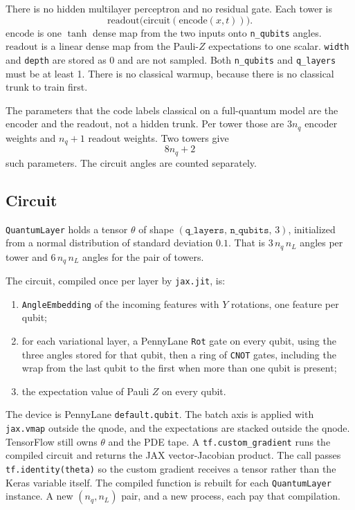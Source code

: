 \documentclass[11pt]{article}
\begin{document}
There is no hidden multilayer perceptron and no residual gate.
Each tower is
\begin{equation}
\mathrm{readout}\big(\mathrm{circuit}(\mathrm{encode}(x,t))\big).
\end{equation}
\(\mathrm{encode}\) is one \(\tanh\) dense map from the two inputs onto \texttt{n\_qubits} angles.
\(\mathrm{readout}\) is a linear dense map from the Pauli-\(Z\) expectations to one scalar.
\texttt{width} and \texttt{depth} are stored as 0 and are not sampled.
Both \texttt{n\_qubits} and \texttt{q\_layers} must be at least 1.
There is no classical warmup, because there is no classical trunk to train first.

The parameters that the code labels classical on a full-quantum model are the encoder and the readout, not a hidden trunk.
Per tower those are \(3n_{q}\) encoder weights and \(n_{q}+1\) readout weights.
Two towers give
\begin{equation}
8n_{q}+2
\end{equation}
such parameters.
The circuit angles are counted separately.

\subsection{Circuit}

\texttt{QuantumLayer} holds a tensor \(\theta\) of shape \((\texttt{q\_layers},\,\texttt{n\_qubits},\,3)\), initialized from a normal distribution of standard deviation \(0.1\).
That is \(3\,n_{q}\,n_{L}\) angles per tower and \(6\,n_{q}\,n_{L}\) angles for the pair of towers.

The circuit, compiled once per layer by \texttt{jax.jit}, is:

\begin{enumerate}[leftmargin=1.4em]
\item \texttt{AngleEmbedding} of the incoming features with \(Y\) rotations, one feature per qubit;
\item for each variational layer, a PennyLane \texttt{Rot} gate on every qubit, using the three angles stored for that qubit, then a ring of \texttt{CNOT} gates, including the wrap from the last qubit to the first when more than one qubit is present;
\item the expectation value of Pauli \(Z\) on every qubit.
\end{enumerate}

The device is PennyLane \texttt{default.qubit}.
The batch axis is applied with \texttt{jax.vmap} outside the qnode, and the expectations are stacked outside the qnode.
TensorFlow still owns \(\theta\) and the PDE tape.
A \texttt{tf.custom\_gradient} runs the compiled circuit and returns the JAX vector-Jacobian product.
The call passes \texttt{tf.identity(theta)} so the custom gradient receives a tensor rather than the Keras variable itself.
The compiled function is rebuilt for each \texttt{QuantumLayer} instance.
A new \((n_{q},n_{L})\) pair, and a new process, each pay that compilation.
\end{document}
